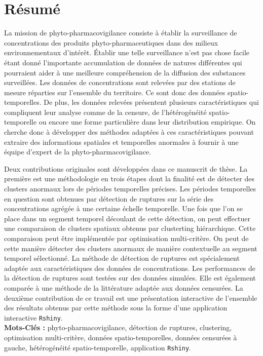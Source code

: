 \section*{Résumé}

La mission de phyto-pharmacovigilance consiste à établir la surveillance de concentrations des produits phyto-pharmaceutiques dans des milieux environnementaux d'intérêt. Établir une telle surveillance n'est pas chose facile étant donné l'importante accumulation de données de natures différentes qui pourraient aider à une meilleure compréhension de la diffusion des substances surveillées. Les données de concentrations sont relevées par des stations de mesure réparties sur l'ensemble du territoire. Ce sont donc des données spatio-temporelles. De plus, les données relevées présentent plusieurs caractéristiques qui compliquent leur analyse comme de la censure, de l'hétérogénéité spatio-temporelle ou encore une forme particulière dans leur distribution empirique. On cherche donc à développer des méthodes adaptées à ces caractéristiques pouvant extraire des informations spatiales et temporelles anormales à fournir à une équipe d'expert de la phyto-pharmacovigilance.       

Deux contributions originales sont développées dans ce manuscrit de thèse. La première est une méthodologie en trois étapes dont la finalité est de détecter des clusters anormaux lors de périodes temporelles précises. Les périodes temporelles en question sont obtenues par détection de ruptures sur la série des concentrations agrégée à une certaine échelle temporelle. Une fois que l'on se place dans un segment temporel découlant de cette détection, on peut effectuer une comparaison de clusters spatiaux obtenus par clusterting hiérarchique. Cette comparaison peut être implémentée par optimisation multi-critère. On peut de cette manière détecter des clusters anormaux de manière contextuelle au segment temporel sélectionné. La méthode de détection de ruptures est spécialement adaptée aux caractéristiques des données de concentrations. Les performances de la détection de ruptures sont testées sur des données simulées. Elle est également comparée à une méthode de la littérature adaptée aux données censurées. La deuxième contribution de ce travail est une présentation interactive de l'ensemble des résultats obtenus par cette méthode sous la forme d'une application interactive \texttt{Rshiny}.  \\

\textbf{Mots-Clés :} phyto-pharmacovigilance, détection de ruptures, clustering, optimisation multi-critère, données spatio-temporelles, données censurées à gauche, hétérogénéité spatio-temporelle, application \texttt{Rshiny}.